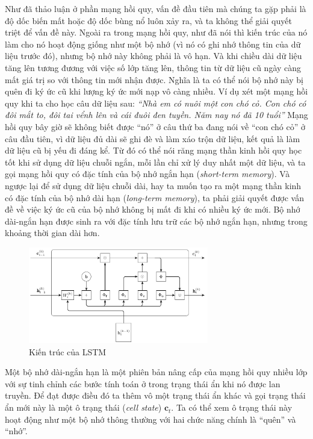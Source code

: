 Như đã thảo luận ở phần mạng hồi quy, vấn đề đầu tiên mà chúng ta gặp phải là độ dốc biến mất hoặc độ dốc bùng nổ luôn xảy ra, và ta không thể giải quyết triệt để vấn đề này. Ngoài ra trong mạng hồi quy, như đã nói thì kiến trúc của nó làm cho nó hoạt động giống như một bộ nhớ (vì nó có ghi nhớ thông tin của dữ liệu trước đó), nhưng bộ nhớ này không phải là vô hạn. Và khi chiều dài dữ liệu tăng lên tương đương với việc số lớp tăng lên, thông tin từ dữ liệu cũ ngày càng mất giá trị so với thông tin mới nhận được. Nghĩa là ta có thể nói bộ nhớ này bị quên đi ký ức cũ khi lượng ký ức mới nạp vô càng nhiều. Ví dụ xét một mạng hồi quy khi ta cho học câu dữ liệu sau:\newline
\indent\textit{``Nhà em có nuôi một con chó cỏ. Con chó có đôi mắt to, đôi tai vểnh lên và cái đuôi đen tuyền. Năm nay nó đã 10 tuổi''}\newline
Mạng hồi quy bây giờ sẽ không biết được ``nó'' ở câu thứ ba đang nói về ``con chó cỏ'' ở câu đầu tiên, vì dữ liệu đủ dài sẽ ghi đè và làm xáo trộn dữ liệu, kết quả là làm dữ liệu cũ bị yếu đi đáng kể. Từ đó có thể nói răng mạng thần kinh hồi quy học tốt khi sử dụng dữ liệu chuỗi ngắn, mỗi lần chỉ xử lý duy nhất một dữ liệu, và ta gọi mạng hồi quy có đặc tính của bộ nhớ ngắn hạn (\textit{short-term memory}). Và ngược lại để sử dụng dữ liệu chuỗi dài, hay ta muốn tạo ra một mạng thần kinh có đặc tính của bộ nhớ dài hạn (\textit{long-term memory}), ta phải giải quyết được vấn đề về việc ký ức cũ của bộ nhớ không bị mất đi khi có nhiều ký ức mới. Bộ nhớ dài-ngắn hạn được sinh ra với đặc tính lưu trữ các bộ nhớ ngắn hạn, nhưng trong khoảng thời gian dài hơn.
\begin{figure}[htbp]
    \centering
    \includegraphics[width=0.7\textwidth]{tikz_image/lstm_architecture.pdf}
    \caption{Kiến trúc của LSTM}
    \label{figure:lstm-architecture}
\end{figure}

Một bộ nhớ dài-ngắn hạn là một phiên bản nâng cấp của mạng hồi quy nhiều lớp với sự tinh chỉnh các bước tính toán ở trong trạng thái ẩn khi nó được lan truyền. Để đạt được điều đó ta thêm vô một trạng thái ẩn khác và gọi trạng thái ẩn mới này là một ô trạng thái (\textit{cell state}) $\mathbf c_t$. Ta có thể xem ô trạng thái này hoạt động như một bộ nhớ thông thường với hai chức năng chính là ``quên'' và ``nhớ''.

